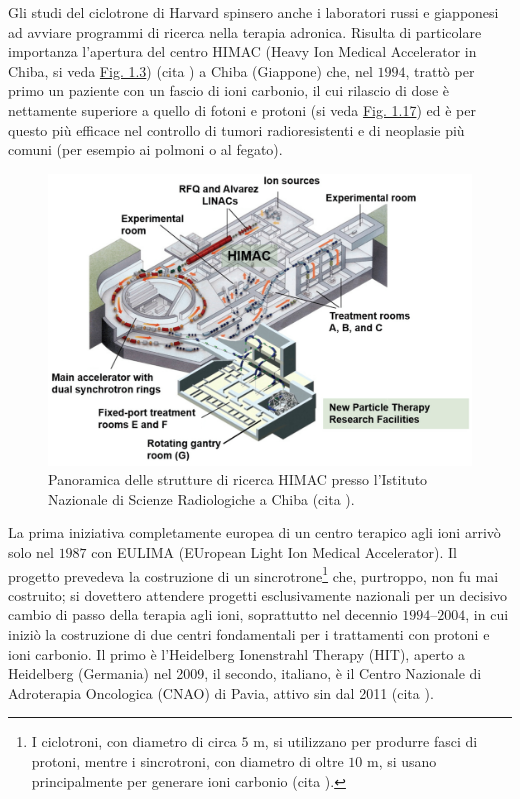 \documentclass[12pt,a4paper,twoside]{report}
\begin{document}
	Gli studi del ciclotrone di Harvard spinsero anche i laboratori russi e giapponesi ad avviare programmi di ricerca nella terapia adronica. Risulta di particolare importanza l'apertura del centro HIMAC (Heavy Ion Medical Accelerator in Chiba, si veda \hyperref[fig:himac]{Fig. 1.3}) (cita
	) a Chiba (Giappone) che, nel $1994$, trattò per primo un paziente con un fascio di ioni carbonio, il cui rilascio di dose è nettamente superiore a quello di fotoni e protoni (si veda \hyperref[fig:photon]{Fig. 1.17}) ed è per questo più efficace nel controllo di tumori radioresistenti e di neoplasie più comuni (per esempio ai polmoni o al fegato).
	
	\begin{figure}[H]
		\centering
		\includegraphics[width=0.9\linewidth]{himac.png}
		\caption{Panoramica delle strutture di ricerca HIMAC presso l'Istituto Nazionale di Scienze Radiologiche a Chiba (cita
			).}
		\label{fig:himac}
	\end{figure}
	
	La prima iniziativa completamente europea di un centro terapico agli ioni arrivò solo nel $1987$ con EULIMA (EUropean Light Ion Medical Accelerator). Il progetto prevedeva la costruzione di un sincrotrone\footnote{I ciclotroni, con diametro di circa $5\mbox{ m}$, si utilizzano per produrre fasci di protoni, mentre i sincrotroni, con diametro di oltre $10\mbox{ m}$, si usano principalmente per generare ioni carbonio (cita
	).} che, purtroppo, non fu mai costruito; si dovettero attendere progetti esclusivamente nazionali per un decisivo cambio di passo della terapia agli ioni, soprattutto nel decennio $1994$--$2004$, in cui iniziò la costruzione di due centri fondamentali per i trattamenti con protoni e ioni carbonio. Il primo è l'Heidelberg Ionenstrahl Therapy (HIT), aperto a Heidelberg (Germania) nel 2009, il secondo, italiano, è il Centro Nazionale di Adroterapia Oncologica (CNAO) di Pavia, attivo sin dal 2011 (cita
	).
	
\end{document}
